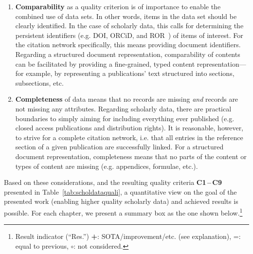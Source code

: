 \begin{enumerate}
    \item \textbf{Comparability} as a quality criterion is of importance to enable the combined use of data sets. In other words, items in the data set should be clearly identified. In the case of scholarly data, this calls for determining the persistent identifiers (e.g. DOI, ORCiD, and ROR~\cite{Meadows2019}) of items of interest. For the citation network specifically, this means providing document identifiers. Regarding a structured document representation, comparability of contents can be facilitated by providing a fine-grained, typed content representation---for example, by representing a publications' text structured into sections, subsections, etc.
    \item \textbf{Completeness} of data means that no records are missing \emph{and} records are not missing any attributes. Regarding scholarly data, there are practical boundaries to simply aiming for including everything ever published (e.g. closed access publications and distribution rights). It is reasonable, however, to strive for a complete citation network, i.e. that all entries in the reference section of a given publication are successfully linked. For a structured document representation, completeness means that no parts of the content or types of content are missing (e.g. appendices, formulae, etc.). %
\end{enumerate}

Based on these considerations, and the resulting quality criteria \textbf{C1\,--\,C9} presented in Table~\ref{tab:scholdataquali}, a quantitative view on the goal of the presented work (enabling higher quality scholarly data) and achieved results is possible.
For each chapter, we present a summary box as the one shown below.\footnote{Result indicator (``Res.'') \textbf{+}: SOTA/improvement/etc. (see explanation), =: equal to previous, $\circ$: not considered.}

